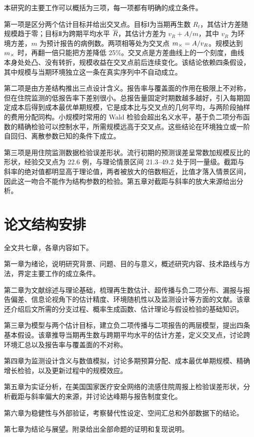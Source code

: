 本研究的主要工作可以概括为三项，每一项都有明确的成立条件。

第一项是区分两个估计目标并给出交叉点。目标Ⅰ为当期再生数 $R_t$，其估计方差随规模趋于零；目标Ⅱ为跨期平均水平 $\overline{R}$，其估计方差为 $v_R+A/m$，其中 $v_R$ 为环境方差，$m$ 为预计报告的病例数。两项相等处为交叉点 $m_{\times}=A/v_R$。规模达到 $m_{\times}$ 时，再翻一倍只能把方差降低 25\%。交叉点是方差曲线上的一个刻度，曲线本身处处凸、没有转折，规模收益在交叉点前后连续变化。该结论依赖四条假设，其中规模与当期环境独立这一条在真实序列中不自动成立。

第二项是由方差结构推出三点设计含义。报告率与覆盖面的作用在极限上不对称，但在住院监测的低报告率下差别很小。总报告量固定时期数越多越好，引入每期固定成本后得到成本最优单期规模，它是成本比与交叉点的几何平均，与两阶段抽样的费用分配同构。小规模时常用的 Wald 检验会超出名义水平，基于负二项分布函数的精确检验可以控制水平，所需规模远高于交叉点。这些结论在环境独立或一阶自回归、离散参数已知的条件下成立。

第三项是用住院监测数据检验误差形状。流行初期的预测误差呈常数加规模反比的形状，经验交叉点为 22.6 例，与理论情景区间 21.3--49.2 处于同一量级。截距与斜率的绝对值都明显高于理论值，两者被放大的倍数相近，比值才落入情景区间，因此这一吻合不能作为结构参数的检验。第五章对截距与斜率的放大来源给出分析。

\section{论文结构安排}
\label{sec:intro-structure}

全文共七章，各章内容如下。

第一章为绪论，说明研究背景、问题、目的与意义，概述研究内容、技术路线与方法，界定主要工作的成立条件。

第二章为文献综述与理论基础，梳理再生数估计、超传播与负二项分布、漏报与报告偏差、信息论视角下的估计精度、环境随机性以及监测设计等方面的文献。该章还介绍后文所需的分支过程、概率生成函数、估计理论与假设检验的基础知识。

第三章为模型与两个估计目标，建立负二项传播与二项报告的两层模型，提出四条基本假设。该章推导当期再生数与跨期平均水平的估计方差，定义交叉点，讨论跨环境汇总以及报告率与覆盖面的不对称。

第四章为监测设计含义与数值模拟，讨论多期预算分配、成本最优单期规模、精确增长检验，以及更新过程中的规模效应。

第五章为实证分析，在美国国家医疗安全网络的流感住院周报上检验误差形状，分析截距与斜率偏大的来源，并讨论达峰期与报告制度变化。

第六章为稳健性与外部验证，考察替代性设定、空间汇总和外部数据下的结论。

第七章为结论与展望。附录给出全部命题的证明和复现说明。
